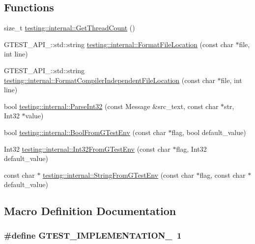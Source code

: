 \subsection*{Functions}
\begin{DoxyCompactItemize}
\item 
size\-\_\-t \hyperlink{namespacetesting_1_1internal_a3b9b3649cd04558bf46c75de52a7ef34}{testing\-::internal\-::\-Get\-Thread\-Count} ()
\item 
G\-T\-E\-S\-T\-\_\-\-A\-P\-I\-\_\-\-::std\-::string \hyperlink{namespacetesting_1_1internal_a31b7c3abed4a7c395f42c61e993989f4}{testing\-::internal\-::\-Format\-File\-Location} (const char $\ast$file, int line)
\item 
G\-T\-E\-S\-T\-\_\-\-A\-P\-I\-\_\-\-::std\-::string \hyperlink{namespacetesting_1_1internal_a1ee4cde97868c53e442d3182496a9f3c}{testing\-::internal\-::\-Format\-Compiler\-Independent\-File\-Location} (const char $\ast$file, int line)
\item 
bool \hyperlink{namespacetesting_1_1internal_ac06fc81336a3d80755f4020d34321766}{testing\-::internal\-::\-Parse\-Int32} (const Message \&src\-\_\-text, const char $\ast$str, Int32 $\ast$value)
\item 
bool \hyperlink{namespacetesting_1_1internal_a1055088bb9b867e1b7b8f096f519d7c5}{testing\-::internal\-::\-Bool\-From\-G\-Test\-Env} (const char $\ast$flag, bool default\-\_\-value)
\item 
Int32 \hyperlink{namespacetesting_1_1internal_ac2ea500678b361ecd2c03e4b02bb2ccf}{testing\-::internal\-::\-Int32\-From\-G\-Test\-Env} (const char $\ast$flag, Int32 default\-\_\-value)
\item 
const char $\ast$ \hyperlink{namespacetesting_1_1internal_a0967cbf18fb1594f82512d8d822aba21}{testing\-::internal\-::\-String\-From\-G\-Test\-Env} (const char $\ast$flag, const char $\ast$default\-\_\-value)
\end{DoxyCompactItemize}


\subsection{Macro Definition Documentation}
\hypertarget{gtest-port_8cc_a83bd232fd1077579fada92c31bb7469f}{
\subsubsection[{G\-T\-E\-S\-T\-\_\-\-I\-M\-P\-L\-E\-M\-E\-N\-T\-A\-T\-I\-O\-N\-\_\-}]{\setlength{\rightskip}{0pt plus 5cm}\#define G\-T\-E\-S\-T\-\_\-\-I\-M\-P\-L\-E\-M\-E\-N\-T\-A\-T\-I\-O\-N\-\_\-~1}}\label{gtest-port_8cc_a83bd232fd1077579fada92c31bb7469f}
